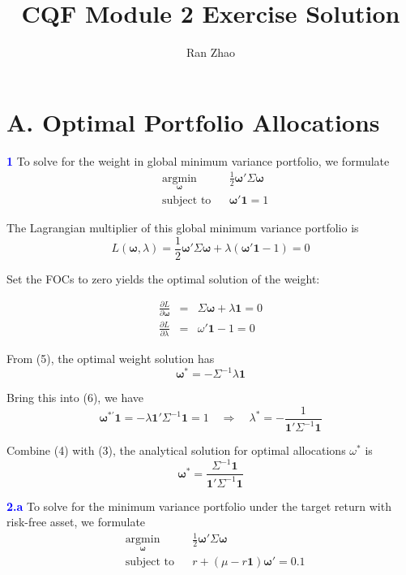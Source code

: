 \documentclass[a4paper,11pt] {article}
\author{Ran Zhao}
\title{CQF Module 2 Exercise Solution}
\date{}
\begin{document}
\maketitle


\section*{A. Optimal Portfolio Allocations}
\textcolor{blue}{\bf 1 } To solve for the weight in global minimum variance portfolio, we formulate
\begin{equation*}
\begin{aligned}
& \underset{\mathbf{\omega}}{\text{argmin}} & & \frac{1}{2}\mathbf{\omega}'\Sigma\mathbf{\omega} \\
& \text{subject to}
& & \mathbf{\omega}'\mathbf{1} = 1
\end{aligned}
\end{equation*}

The Lagrangian multiplier of this global minimum variance portfolio is
$$
L(\mathbf{\omega}, \lambda) = \frac{1}{2}\mathbf{\omega}'\Sigma\mathbf{\omega} + \lambda(\mathbf{\omega}'\mathbf{1} - 1) = 0
$$

Set the FOCs to zero yields the optimal solution of the weight:

\begin{eqnarray}
\frac{\partial L}{\partial \mathbf{\omega}} &=& \Sigma \mathbf{\omega} + \lambda \mathbf{1} = 0 \\
\frac{\partial L}{\partial \lambda} &=& \omega'\mathbf{1} - 1 = 0
\end{eqnarray}

From (5), the optimal weight solution has
\begin{equation}
\mathbf{\omega}^* = -\Sigma^{-1} \lambda \mathbf{1}
\end{equation}

Bring this into (6), we have
\begin{equation}
\mathbf{\omega}^{*'} \mathbf{1} = -\lambda \mathbf{1}' \Sigma^{-1} \mathbf{1} = 1 \quad \Rightarrow \quad \lambda^* = -\frac{1}{\mathbf{1}'\Sigma^{-1}\mathbf{1}}
\end{equation}

Combine (4) with (3), the analytical solution for optimal allocations $\omega^*$ is
$$
\mathbf{\omega}^* = \frac{\Sigma^{-1}\mathbf{1}}{\mathbf{1}'\Sigma^{-1}\mathbf{1}}
$$

\textcolor{blue}{\bf 2.a } To solve for the minimum variance portfolio under the target return with risk-free asset, we formulate
\begin{equation*}
\begin{aligned}
& \underset{\mathbf{\omega}}{\text{argmin}} & & \frac{1}{2}\mathbf{\omega}'\Sigma\mathbf{\omega} \\
& \text{subject to}
& & r + (\mu-r\mathbf{1})\mathbf{\omega}' = 0.1
\end{aligned}
\end{equation*}
\end{document}
